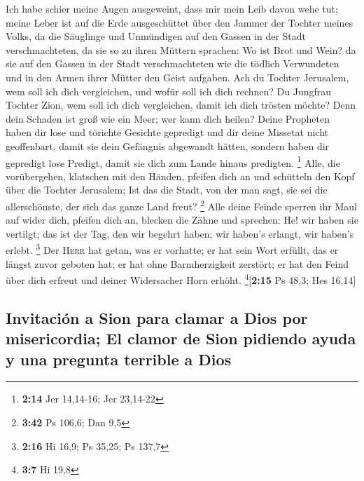  Ich habe schier meine Augen ausgeweint, dass mir mein
Leib davon wehe tut; meine Leber ist auf die Erde ausgeschüttet über den
Jammer der Tochter meines Volks, da die Säuglinge und Unmündigen auf den
Gassen in der Stadt verschmachteten,  da sie so zu ihren
Müttern sprachen: Wo ist Brot und Wein? da sie auf den Gassen in der
Stadt verschmachteten wie die tödlich Verwundeten und in den Armen ihrer
Mütter den Geist aufgaben.  Ach du Tochter Jerusalem, wem
soll ich dich vergleichen, und wofür soll ich dich rechnen? Du Jungfrau
Tochter Zion, wem soll ich dich vergleichen, damit ich dich trösten
möchte? Denn dein Schaden ist groß wie ein Meer; wer kann dich heilen?
 Deine Propheten haben dir lose und törichte Gesichte
gepredigt und dir deine Missetat nicht geoffenbart, damit sie dein
Gefängnis abgewandt hätten, sondern haben dir gepredigt lose Predigt,
damit sie dich zum Lande hinaus predigten. \footnote{\textbf{2:14} Jer
  14,14-16; Jer 23,14-22}  Alle, die vorübergehen,
klatschen mit den Händen, pfeifen dich an und schütteln den Kopf über
die Tochter Jerusalem; Ist das die Stadt, von der man sagt, sie sei die
allerschönste, der sich das ganze Land freut? \footnote{\textbf{3:42} Ps
  106,6; Dan 9,5}  Alle deine Feinde sperren ihr Maul auf
wider dich, pfeifen dich an, blecken die Zähne und sprechen: He! wir
haben sie vertilgt; das ist der Tag, den wir begehrt haben; wir haben's
erlangt, wir haben's erlebt. \footnote{\textbf{2:16} Hi 16,9; Ps 35,25;
  Ps 137,7}  Der \textsc{Herr} hat getan, was er
vorhatte; er hat sein Wort erfüllt, das er längst zuvor geboten hat; er
hat ohne Barmherzigkeit zerstört; er hat den Feind über dich erfreut und
deiner Widersacher Horn erhöht. \footnote{\textbf{3:7} Hi 19,8}{[}\textbf{2:15}
Ps 48,3; Hes 16,14{]}

\hypertarget{invitaciuxf3n-a-sion-para-clamar-a-dios-por-misericordia-el-clamor-de-sion-pidiendo-ayuda-y-una-pregunta-terrible-a-dios}{%
\subsection{Invitación a Sion para clamar a Dios por misericordia; El
clamor de Sion pidiendo ayuda y una pregunta terrible a
Dios}\label{invitaciuxf3n-a-sion-para-clamar-a-dios-por-misericordia-el-clamor-de-sion-pidiendo-ayuda-y-una-pregunta-terrible-a-dios}}

